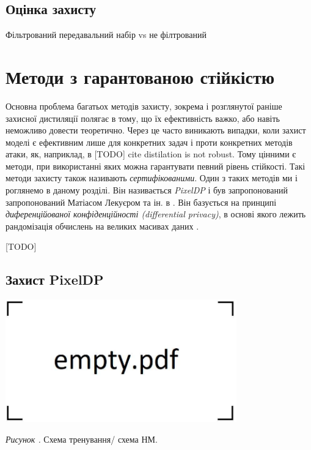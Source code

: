 \documentclass[14pt,a4paper]{extarticle}
\newcounter{e}
\newcounter{pic}
\newcommand{\pic}[1]{\refstepcounter{pic} \vspace{-0.3cm}\textit{Рисунок \arabic{pic}\label{#1}.}}
\numberwithin{equation}{section}
\numberwithin{figure}{section}
\begin{document}
 \subsection{Оцінка захисту}
 
 Фільтрований передавальний набір vs не філтрований
 
 \newpage
 \thispagestyle{empty}
 \section{Методи з гарантованою стійкістю}
 Основна проблема багатьох методів захисту, зокрема і розглянутої раніше захисної дистиляції полягає в тому, що їх ефективність важко, або навіть неможливо довести теоретично. Через це часто виникають випадки, коли захист моделі є ефективним лише для конкретних задач і проти конкретних методів атаки,
 як, наприклад, в [TODO] cite distilation is not robust. Тому цінними є методи, при використанні яких можна гарантувати певний рівень стійкості. Такі методи захисту також називають \textit{сертифікованими}. Один з таких методів ми і роглянемо в даному розділі. Він називається \textit{PixelDP} і був запропонований  запропонований Матіасом Лекуєром та ін. в \cite{pixeldp}. Він базується на принципі \textit{диференційованої конфіденційності (differential privacy)}, в основі якого лежить рандомізація обчислень на великих масивах даних \cite{differential-privacy}.
 
 [TODO]
 \subsection{Захист PixelDP}
 
 \begin{center}
 	\includegraphics[width=10cm]{../images/empty.pdf}
 \end{center}
 \begin{center}
 	\pic{distilation} Схема тренування/ схема НМ.
 \end{center}
 
\end{document}
